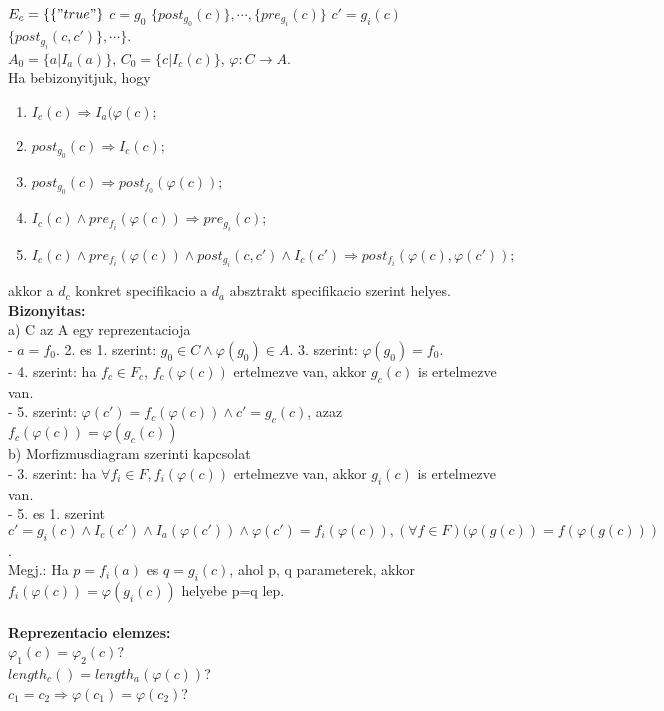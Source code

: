 \documentclass[a4paper,10pt]{article}
\begin{document}
$E_c=\lbrace\lbrace"true"\rbrace$ $c=g_0$ $\lbrace post_{g_0}(c)\rbrace, \cdots, \lbrace pre_{g_i}(c)\rbrace$ $c'=g_i(c)$ $\lbrace post_{g_i}(c, c')\rbrace, \cdots \rbrace$.\\
$A_0 = \lbrace a\vert I_a(a)\rbrace$, $C_0 = \lbrace c\vert I_c(c)\rbrace$, $\varphi:C\to A$.\\
Ha bebizonyitjuk, hogy
\begin{enumerate}
\item $I_c(c) \Rightarrow I_a(\varphi(c)$;
\item $post_{g_0}(c) \Rightarrow I_c(c)$;
\item $post_{g_0}(c) \Rightarrow post_{f_0}(\varphi(c))$;
\item $I_c(c) \wedge pre_{f_i}(\varphi(c)) \Rightarrow pre_{g_i}(c)$;
\item $I_c(c) \wedge pre_{f_i}(\varphi(c)) \wedge post_{g_i}(c,c') \wedge I_c(c') \Rightarrow post_{f_i}(\varphi(c), \varphi(c'));$
\end{enumerate}
akkor a $d_c$ konkret specifikacio a $d_a$ absztrakt specifikacio szerint helyes.\\
\textbf{Bizonyitas:}\\
a) C az A egy reprezentacioja\\
- $a = f_0$. 2. es 1. szerint: $g_0\in C \wedge \varphi(g_0) \in A$. 3. szerint: $\varphi(g_0)=f_0$.\\
- 4. szerint: ha $f_c\in F_c$, $f_c(\varphi(c))$ ertelmezve van, akkor $g_c(c)$ is ertelmezve van.\\
- 5. szerint: $\varphi(c')=f_c(\varphi(c)) \wedge c'=g_c(c)$, azaz $f_c(\varphi(c))=\varphi(g_c(c))$\\
b) Morfizmusdiagram szerinti kapcsolat\\
- 3. szerint: ha $\forall f_i\in F, f_i(\varphi(c))$ ertelmezve van, akkor $g_i(c)$ is ertelmezve van.\\
- 5. es 1. szerint $c'=g_i(c) \wedge I_c(c') \wedge I_a(\varphi(c')) \wedge \varphi(c')=f_i(\varphi(c)), (\forall f\in F)(\varphi(g(c)) = f(\varphi(g(c)))$.\\
Megj.: Ha $p=f_i(a)$ es $q=g_i(c)$, ahol p, q parameterek, akkor $f_i(\varphi(c)) = \varphi(g_i(c))$ helyebe p=q lep.\\ \\
\textbf{Reprezentacio elemzes:}\\
$\varphi_1(c) = \varphi_2(c)$?\\
$length_c()=length_a(\varphi(c))$?\\
$c_1=c_2 \Rightarrow \varphi(c_1) = \varphi(c_2)$?\\
\end{document}
